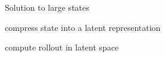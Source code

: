 \begin{frame}{Solution to large states}
	\begin{PraesentationAufzaehlung}
	    \item compress state into a latent representation
	    \item compute rollout in latent space
	\end{PraesentationAufzaehlung}
\end{frame}


\begin{frame}

\begin{PraesentationAufzaehlung}
    \item 
    \item 
    \item 
\end{PraesentationAufzaehlung}

\end{frame}
\clearpage



